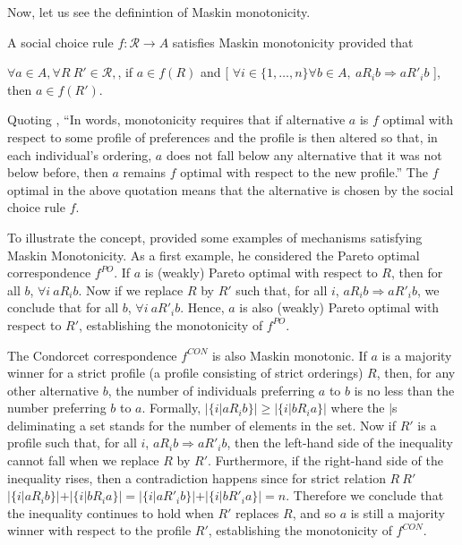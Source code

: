 Now, let us see the definintion of Maskin monotonicity.

\begin{definition}
A social choice rule $f: \mathscr{R} \rightarrow A$ satisfies Maskin
monotonicity provided that

$\forall a \in A, \forall R\ R' \in \mathscr{R},$, if $a \in f(R)$ and [
$\forall i \in \{1, \dots, n\} \forall b \in A  ,\  aR_i b \Rightarrow
aR'_i b$ ], then $ a \in f(R')$.
\end{definition}

Quoting \parencite{Maskin1999}, ``In words, monotonicity requires that if alternative $a$ is $f$ optimal with respect to some
profile of preferences and the profile is then altered so that, in each individual’s ordering,
$a$ does not fall below any alternative that it was not below before, then $a$ remains $f$ 
optimal with respect to the new profile.'' The $f$ optimal in the above quotation means that the alternative is chosen by the social choice rule $f$.

To illustrate the concept, \parencite{Maskin1999} provided some examples of
mechanisms satisfying Maskin Monotonicity. As a first example, he considered the Pareto optimal correspondence $f^{PO}$. 
If $a$ is (weakly) Pareto optimal with respect to $R$, then for all $b$,  $\forall i \ a R_i b$. Now if we replace $R$ by $R'$ such that, for all $i$, $a R_i b \Rightarrow  a R'_i b$, we conclude that
for all $b$, $\forall i \ a R'_i b$. Hence, $a$ is also (weakly) Pareto optimal with respect to $R'$,  establishing the monotonicity of $f^{PO}$.

The Condorcet correspondence $f^{CON}$ is also Maskin monotonic. If $a$ is a majority winner
for a strict profile (a profile consisting of strict orderings) $R$, then, for any other alternative
$b$, the number of individuals preferring $a$ to $b$ is no less than the number preferring $b$ to
$a$. Formally, 
$ |\{i|a R_i b\}| \geq |\{i|b R_i a\}| $ where the $|$s deliminating a set stands for the number of elements in the set.
Now if $R'$ is a profile such that, for all $i$, $a R_i b \Rightarrow a R'_i b$, then the left-hand side of the inequality cannot
fall when we replace $R$ by $R'$. Furthermore, if the right-hand side of the inequality rises, then a contradiction happens since for strict relation 
$R\ R'$ $|\{i|a R_i b\}| + |\{i|b R_i a\}|= |\{i|a R'_i b\}| + |\{i|b R'_i a\}|= n $. Therefore we conclude that the inequality continues to hold when $R'$ replaces $R$, and
so $a$ is still a majority winner with respect to the profile $R'$, establishing the monotonicity of $f^{CON}$.


